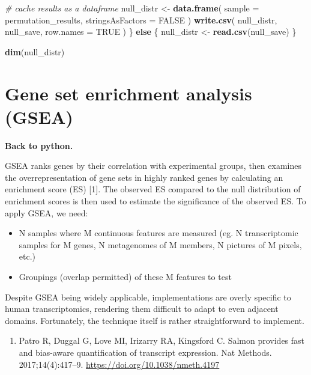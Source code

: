 \documentclass[
]{book}
\newenvironment{Shaded}{\begin{snugshade}}{\end{snugshade}}
\newcommand{\AttributeTok}[1]{\textcolor[rgb]{0.13,0.29,0.53}{#1}}
\newcommand{\CommentTok}[1]{\textcolor[rgb]{0.56,0.35,0.01}{\textit{#1}}}
\newcommand{\ConstantTok}[1]{\textcolor[rgb]{0.56,0.35,0.01}{#1}}
\newcommand{\ControlFlowTok}[1]{\textcolor[rgb]{0.13,0.29,0.53}{\textbf{#1}}}
\newcommand{\FunctionTok}[1]{\textcolor[rgb]{0.13,0.29,0.53}{\textbf{#1}}}
\newcommand{\NormalTok}[1]{#1}
\newcommand{\OtherTok}[1]{\textcolor[rgb]{0.56,0.35,0.01}{#1}}
\providecommand{\tightlist}{%
  \setlength{\itemsep}{0pt}\setlength{\parskip}{0pt}}
\begin{document}
\begin{Shaded}
\begin{Highlighting}[numbers=left,,]
  \CommentTok{\# cache results as a dataframe}
\NormalTok{  null\_distr }\OtherTok{\textless{}{-}} \FunctionTok{data.frame}\NormalTok{(}
    \AttributeTok{sample =}\NormalTok{ permutation\_results,}
    \AttributeTok{stringsAsFactors =} \ConstantTok{FALSE}
\NormalTok{  )}
  \FunctionTok{write.csv}\NormalTok{(}
\NormalTok{    null\_distr,}
\NormalTok{    null\_save,}
    \AttributeTok{row.names =} \ConstantTok{TRUE}
\NormalTok{  )}
\NormalTok{\} }\ControlFlowTok{else}\NormalTok{ \{}
\NormalTok{  null\_distr }\OtherTok{\textless{}{-}} \FunctionTok{read.csv}\NormalTok{(null\_save)}
\NormalTok{\}}

\FunctionTok{dim}\NormalTok{(null\_distr)}
\end{Highlighting}
\end{Shaded}

\section{Gene set enrichment analysis (GSEA)}\label{gene-set-enrichment-analysis-gsea}

\textbf{Back to python.}

GSEA ranks genes by their correlation with experimental groups, then examines the overrepresentation of gene sets in highly ranked genes by calculating an
enrichment score (ES) {[}1{]}. The observed ES compared to the null distribution of enrichment scores is then used to estimate the significance of the observed ES.
To apply GSEA, we need:

\begin{itemize}
\tightlist
\item
  N samples where M continuous features are measured (eg. N transcriptomic samples for M genes, N metagenomes of M members, N pictures of M pixels, etc.)
\item
  Groupings (overlap permitted) of these M features to test
\end{itemize}

Despite GSEA being widely applicable, implementations are overly specific to human transcriptomics, rendering them difficult to adapt to even adjacent domains.
Fortunately, the technique itself is rather straightforward to implement.

\begin{enumerate}
\def\labelenumi{\arabic{enumi}.}
\tightlist
\item
  Patro R, Duggal G, Love MI, Irizarry RA, Kingsford C. Salmon provides fast and bias-aware quantification of transcript expression. Nat Methods. 2017;14(4):417--9. \url{https://doi.org/10.1038/nmeth.4197}
\end{enumerate}
\end{document}
